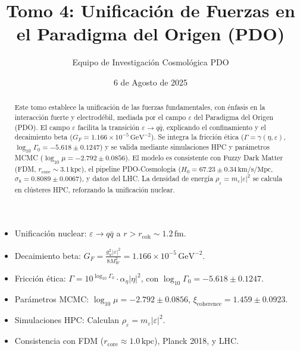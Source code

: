 \documentclass[a4paper,12pt]{article}
\newcommand{\eps}{\varepsilon}
\newcommand{\etaa}{\eta}
\newcommand{\gev}{\text{GeV}}
\newcommand{\rcore}{r_{\text{core}}}
\begin{document}
\title{Tomo 4: Unificación de Fuerzas en el Paradigma del Origen (PDO)}
\author{Equipo de Investigación Cosmológica PDO}
\date{6 de Agosto de 2025}
\maketitle

\begin{abstract}
Este tomo establece la unificación de las fuerzas fundamentales, con énfasis en la interacción fuerte y electrodébil, mediada por el campo \(\eps\) del Paradigma del Origen (PDO). El campo \(\eps\) facilita la transición \(\eps \to q \bar{q}\), explicando el confinamiento y el decaimiento beta (\(G_F = 1.166 \times 10^{-5} \, \gev^{-2}\)). Se integra la fricción ética (\(\Gamma = \gamma(\etaa, \eps)\), \(\log_{10} \Gamma_0 = -5.618 \pm 0.1247\)) y se valida mediante simulaciones HPC y parámetros MCMC (\(\log_{10} \mu = -2.792 \pm 0.0856\)). El modelo es consistente con Fuzzy Dark Matter (FDM, \(\rcore \sim 3.1 \, \text{kpc}\)), el pipeline PDO-Cosmología (\(H_0 = 67.23 \pm 0.34 \, \text{km/s/Mpc}\), \(\sigma_8 = 0.8089 \pm 0.0067\)), y datos del LHC. La densidad de energía \(\rho_\eps = m_\eps |\eps|^2\) se calcula en clústeres HPC, reforzando la unificación nuclear.
\end{abstract}

\begin{tcolorbox}[colback=blue!5!white,colframe=blue!75!black,title=Puntos Clave]
\begin{itemize}
    \item Unificación nuclear: \(\eps \to q \bar{q}\) a \(r > r_{\text{coh}} \sim 1.2 \, \text{fm}\).
    \item Decaimiento beta: \(G_F = \frac{g_w^2 |\eps|^2}{8M_W^2} = 1.166 \times 10^{-5} \, \gev^{-2}\).
    \item Fricción ética: \(\Gamma = 10^{\log_{10} \Gamma_0} \cdot \alpha_\eta |\etaa|^2\), con \(\log_{10} \Gamma_0 = -5.618 \pm 0.1247\).
    \item Parámetros MCMC: \(\log_{10} \mu = -2.792 \pm 0.0856\), \(\xi_{\text{coherence}} = 1.459 \pm 0.0923\).
    \item Simulaciones HPC: Calculan \(\rho_\eps = m_\eps |\eps|^2\).
    \item Consistencia con FDM (\(\rcore \approx 1.0 \, \text{kpc}\)), Planck 2018, y LHC.
\end{itemize}
\end{tcolorbox}

\tableofcontents
\newpage
\end{document}
